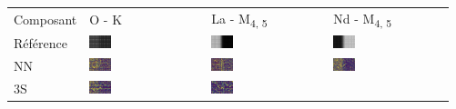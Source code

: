 \begin{tabular}{m{}*{3}{M{0.21\textwidth}}}
Composant&O - K&La - M\textsubscript{4, 5}&Nd - M\textsubscript{4, 5}\\
Référence
&\includegraphics[width=0.2\textwidth]{img/chapitre4/figure15/synth/Synth_GT_band_0.png}
&\includegraphics[width=0.2\textwidth]{img/chapitre4/figure15/synth/Synth_GT_band_1.png}
&\includegraphics[width=0.2\textwidth]{img/chapitre4/figure15/synth/Synth_GT_band_2.png}
\\
NN
&\includegraphics[width=0.2\textwidth]{img/chapitre4/figure15/synth/Synth_interpolation_band_0.png}
&\includegraphics[width=0.2\textwidth]{img/chapitre4/figure15/synth/Synth_interpolation_band_1.png}
&\includegraphics[width=0.2\textwidth]{img/chapitre4/figure15/synth/Synth_interpolation_band_2.png}
\\
3S
&\includegraphics[width=0.2\textwidth]{img/chapitre4/figure15/synth/Synth_3S_band_0.png}
&\includegraphics[width=0.2\textwidth]{img/chapitre4/figure15/synth/Synth_3S_band_1.png}

\end{tabular}
